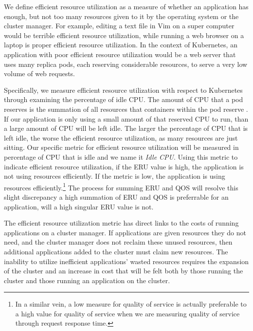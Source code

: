 We define efficient resource utilization as a measure of whether an application
has enough, but not too many resources given to it by the operating system or
the cluster manager. For example, editing a text file in Vim on a super computer
would be terrible efficient resource utilization, while running a web browser on
a laptop is proper efficient resource utilization. In the context of Kubernetes,
an application with poor efficient resource utilization would be a web server
that uses many replica pods, each reserving considerable resources,
to serve a very low volume of web requests.

Specifically, we measure efficient resource utilization with respect to
Kubernetes through examining the percentage of idle CPU.
The amount of CPU that a pod reserves is the summation of
all resources that containers within the pod reserve
\cite{k8s-compute-resources}. If our application is only using a small amount of
that reserved CPU to run, than a large amount of CPU will be left idle. The
larger the percentage of CPU that is left idle, the worse the efficient resource
utilization, as many resources are just sitting. Our specific metric for efficient resource
utilization will be measured in percentage of CPU that is idle and we name it
\textit{Idle CPU}. Using this metric to indicate efficient resource utilization,
if the ERU value is high, the application is not using resources efficiently. If
the metric is low, the application is using resources efficiently.\footnote{In a
similar vein, a low measure for quality of service is actually preferable to a
high value for quality of service when we are measuring quality of service
through request response time.} The process for summing ERU and QOS will resolve
this slight discrepancy a high summation of ERU and QOS is preferrable for an
application, will a high singular ERU value is not.

The efficient resource utilization metric has direct links to the costs of
running applications on a cluster manager. If applications are given resources
they do not need, and the cluster manager does not reclaim these unused
resources, then additional applications added to the cluster must claim new
resources. The inability to utilize inefficient applications' wasted resources
requires the expansion of the cluster and an increase in cost that will be felt
both by those running the cluster and those running an application on the
cluster.
